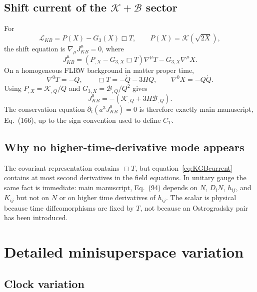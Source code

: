 \documentclass[aps,prd,reprint,onecolumn,notitlepage,nofootinbib,longbibliography,floatfix]{revtex4-2}
\theoremstyle{scstyle}
\theoremstyle{definition}
\theoremstyle{remark}
\newcommand{\cK}{\mathcal K}
\newcommand{\cB}{\mathcal B}
\newcommand{\cL}{\mathcal L}
\begin{document}
\subsection{Shift current of the \texorpdfstring{$\cK+\cB$}{K+B} sector}

For
\begin{equation}
\cL_{KB}=P(X)-G_3(X)\Box T,
\qquad
P(X)=\cK(\sqrt{2X}),
\label{eq:PKGB}
\end{equation}
the shift equation is $\nabla_\mu J_{KB}^\mu=0$, where
\begin{equation}
J_{KB}^\mu
=\left(P_{,X}-G_{3,X}\Box T\right)\nabla^\mu T
-G_{3,X}\nabla^\mu X.
\label{eq:KGBcurrent}
\end{equation}
On a homogeneous FLRW background in matter proper time,
\begin{equation}
\nabla^0T=-Q,
\qquad
\Box T=-\dot Q-3HQ,
\qquad
\nabla^0X=-Q\dot Q.
\label{eq:homKGBidentities}
\end{equation}
Using $P_{,X}=\cK_{,Q}/Q$ and $G_{3,X}=\cB_{,Q}/Q^2$ gives
\begin{equation}
J_{KB}^0=-\left(\cK_{,Q}+3H\cB_{,Q}\right).
\label{eq:homKGBcurrent}
\end{equation}
The conservation equation $\partial_t(a^3J_{KB}^0)=0$ is therefore exactly main manuscript, Eq.~(166), up to the sign convention used to define $C_T$.

\subsection{Why no higher-time-derivative mode appears}

The covariant representation contains $\Box T$, but equation~\eqref{eq:KGBcurrent} contains at most second derivatives in the field equations. In unitary gauge the same fact is immediate: main manuscript, Eq.~(94) depends on $N$, $D_iN$, $h_{ij}$, and $K_{ij}$ but not on $\dot N$ or on higher time derivatives of $h_{ij}$. The scalar is physical because time diffeomorphisms are fixed by $T$, not because an Ostrogradsky pair has been introduced.

\section{Detailed minisuperspace variation}
\label{app:minisuperspace}

\subsection{Clock variation}
\end{document}
